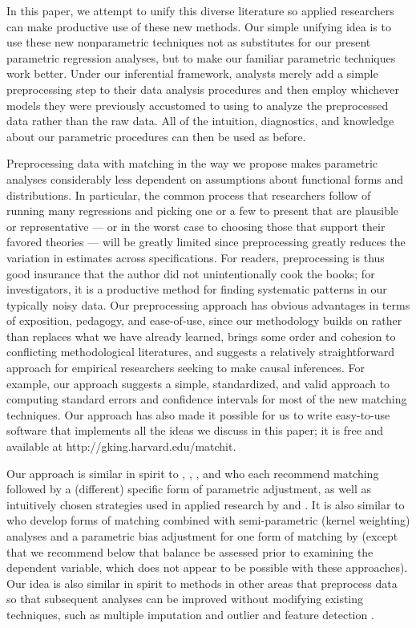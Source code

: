 \documentclass[11pt,titlepage]{article}
\begin{document}
In this paper, we attempt to unify this diverse literature so applied
researchers can make productive use of these new methods.  Our simple
unifying idea is to use these new nonparametric techniques not as
substitutes for our present parametric regression analyses, but to
make our familiar parametric techniques work better.  Under our
inferential framework, analysts merely add a simple preprocessing step
to their data analysis procedures and then employ whichever models
they were previously accustomed to using to analyze the preprocessed
data rather than the raw data.  All of the intuition, diagnostics, and
knowledge about our parametric procedures can then be used as before.

Preprocessing data with matching in the way we propose makes
parametric analyses considerably less dependent on assumptions about
functional forms and distributions.  In particular, the common process
that researchers follow of running many regressions and picking one or
a few to present that are plausible or representative --- or in the
worst case to choosing those that support their favored theories ---
will be greatly limited since preprocessing greatly reduces the
variation in estimates across specifications.  For readers,
preprocessing is thus good insurance that the author did not
unintentionally cook the books; for investigators, it is a productive
method for finding systematic patterns in our typically noisy data.
Our preprocessing approach has obvious advantages in terms of
exposition, pedagogy, and ease-of-use, since our methodology builds on
rather than replaces what we have already learned, brings some order
and cohesion to conflicting methodological literatures, and suggests a
relatively straightforward approach for empirical researchers seeking
to make causal inferences.  For example, our approach suggests a
simple, standardized, and valid approach to computing standard errors
and confidence intervals for most of the new matching techniques.  Our
approach has also made it possible for us to write easy-to-use
software that implements all the ideas we discuss in this paper; it is
free and available at http://gking.harvard.edu/matchit.

Our approach is similar in spirit to \citet{ImaDyk03},
\citet{RosRub84a}, \citet{Rubin79}, and \citet{RubTho00} who each
recommend matching followed by a (different) specific form of
parametric adjustment, as well as intuitively chosen strategies used
in applied research by \citet{Rosenbaum86} and \citet{GlaLevMye03}.
It is also similar to \citet{HecIchTod98} who develop forms of
matching combined with semi-parametric (kernel weighting) analyses and
a parametric bias adjustment for one form of matching by
\citep{AbaImb04} (except that we recommend below that balance be
assessed prior to examining the dependent variable, which does not
appear to be possible with these approaches).  Our idea is also
similar in spirit to methods in other areas that preprocess data so
that subsequent analyses can be improved without modifying existing
techniques, such as multiple imputation \citep{Rubin87,KinHonJos01}
and outlier and feature detection \citep[][Ch.8]{Bishop95}.
\end{document}
